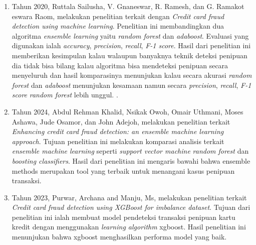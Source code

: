 \begin{enumerate}[noitemsep]
    \item Tahun 2020, Ruttala Sailusha, V. Gnaneswar, R. Ramesh, dan G. Ramakot eswara Raom, melakukan penelitian terkait dengan \textit{Credit card fraud detection using machine learning}. Penelitian ini membandingkan dua algoritma \textit{ensemble learning} yaitu \textit{random forest} dan \textit{adaboost}. Evaluasi yang digunakan ialah \textit{accuracy}, \textit{precision}, \textit{recall}, \textit{F-1 score}. Hasil dari penelitian ini memberikan kesimpulan kalau walaupun banyaknya teknik deteksi penipuan dia tidak bisa bilang kalau algoritma bisa mendeteksi penipuan secara menyeluruh dan hasil komparasinya menunjukan kalau secara akurasi \textit{random forest} dan \textit{adaboost} menunjukan kesamaan namun secara \textit{precision}, \textit{recall}, \textit{F-1 score} \textit{random forest} lebih unggul. \cite{9121114}.
    \item Tahun 2024, Abdul Rehman Khalid, Nsikak Owoh, Omair Uthmani, Moses Ashawa, Jude Osamor, dan John Adejoh, melakukan penelitian terkait \textit{Enhancing credit card fraud detection: an ensemble machine learning approach}. Tujuan penelitian ini melakukan komparasi analisis terkait \textit{ensemble machine learning} seperti \textit{support vector machine} \textit{random forest} dan \textit{boosting classifiers}. Hasil dari penelitian ini mengaris bawahi bahwa ensemble methods merupakan tool yang terbaik untuk menangani kasus penipuan transaksi. \cite{khalid2024enhancing}
    \item Tahun 2023, Purwar, Archana and Manju, Ms, melakukan penelitian terkait \textit{Credit card fraud detection using XGBoost for imbalance dataset}. Tujuan dari penelitian ini ialah membuat model pendeteksi transaksi penipuan kartu kredit dengan menggunakan \textit{learning algorithm} xgboost. Hasil penelitian ini menunjukan bahwa xgboost menghasilkan performa model yang baik. \cite{purwar2023credit}
\end{enumerate}

